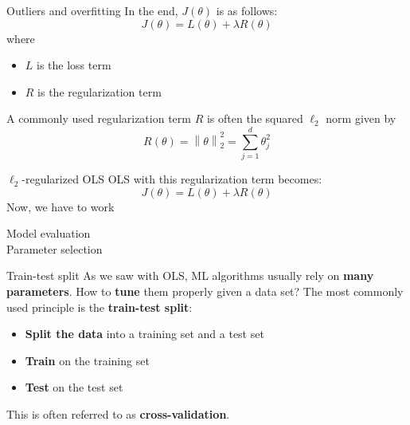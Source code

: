 \documentclass{beamer}
\newcommand{\1}[1]{\mathbbm{1}\left[#1\right]}
\newcommand{\norm}[1]{\left\lVert#1\right\rVert}
\begin{document}
\begin{frame}{Outliers and overfitting}
In the end, $J(\theta)$ is as follows:
\begin{equation*}
J(\theta) = L(\theta) + \lambda R(\theta)
\end{equation*}
where 
\begin{itemize}
	\item $L$ is the loss term
	\item $R$ is the regularization term
\end{itemize}
\pause
\vfill
A commonly used regularization term $R$ is often the squared $\ell_2$ norm given by
\begin{equation*}
R(\theta) = \norm{\theta}_2^2 = \sum_{j = 1}^d \theta_j^2
\end{equation*}
\end{frame}

\begin{frame}{$\ell_2$-regularized OLS}
OLS with this regularization term becomes:
\begin{equation*}
J(\theta) = L(\theta) + \lambda R(\theta)
\end{equation*}
\vfill
\pause
Now, we have to work
\end{frame}

\begin{frame}
	\center
	\huge{Model evaluation\\ Parameter selection}
\end{frame}

\begin{frame}{Train-test split}
As we saw with OLS, ML algorithms usually rely on \textbf{many parameters}. How to \textbf{tune} them properly given a data set?
\vfill
\pause
The most commonly used principle is the \textbf{train-test split}:
\begin{itemize}
	\item \textbf{Split the data} into a training set and a test set
	\item \textbf{Train} on the training set
	\item \textbf{Test} on the test set
\end{itemize}
\vfill
\pause
This is often referred to as \textbf{cross-validation}.
\end{frame}
\end{document}
